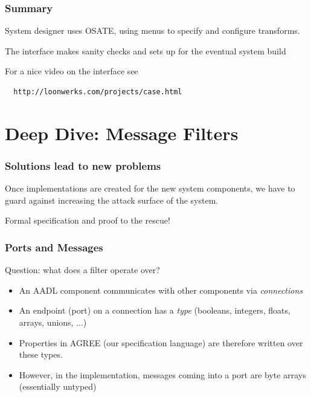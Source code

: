 \documentclass{beamer}
\begin{document}
\begin{frame}[fragile]\frametitle{Summary}

System designer uses OSATE, using menus to specify and configure transforms.

The interface makes sanity checks and sets up for the eventual system build

For a nice video on the interface see
\begin{verbatim}
  http://loonwerks.com/projects/case.html
\end{verbatim}

\end{frame}

\section {Deep Dive: Message Filters}

\begin{frame}\frametitle{Solutions lead to new problems}

Once implementations are created for the new system components, we
have to guard against increasing the attack surface of the system.

Formal specification and proof to the rescue!

\end{frame}

\begin{frame}\frametitle{Ports and Messages}

Question: what does a filter operate over?

\begin{itemize}

  \item An AADL component communicates with other components via \emph{connections}

\item  An endpoint (port) on a connection has a \emph{type} (booleans,
  integers, floats, arrays, unions, ...)

\item Properties in AGREE (our specification language) are therefore
  written over these types.

\item However, in the implementation, messages coming into a port are
  byte arrays (essentially untyped)

\end{itemize}

\end{frame}
\end{document}
